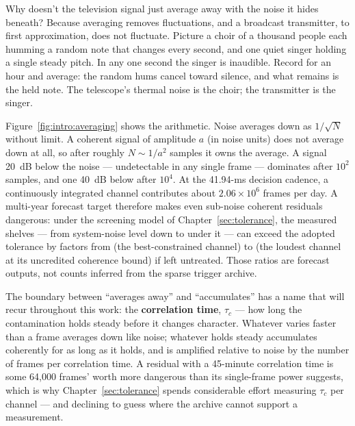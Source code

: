 Why doesn't the television signal just average away with the noise it hides beneath? Because averaging removes fluctuations, and a broadcast transmitter, to first approximation, does not fluctuate. Picture a choir of a thousand people each humming a random note that changes every second, and one quiet singer holding a single steady pitch. In any one second the singer is inaudible. Record for an hour and average: the random hums cancel toward silence, and what remains is the held note. The telescope's thermal noise is the choir; the transmitter is the singer.

Figure~\ref{fig:intro:averaging} shows the arithmetic. Noise averages down as $1/\sqrt{N}$ without limit. A coherent signal of amplitude $a$ (in noise units) does not average down at all, so after roughly $N \sim 1/a^2$ samples it owns the average. A signal 20~dB below the noise --- undetectable in any single frame --- dominates after $10^2$ samples, and one 40~dB below after $10^4$. At the 41.94-ms decision cadence, a continuously integrated channel contributes about $2.06\times10^6$ frames per day. A multi-year forecast target therefore makes even sub-noise coherent residuals dangerous: under the screening model of Chapter~\ref{sec:tolerance}, the measured shelves --- from system-noise level down to  under it --- can exceed the adopted tolerance by factors from  (the best-constrained channel) to  (the loudest channel at its uncredited coherence bound) if left untreated. Those ratios are forecast outputs, not counts inferred from the sparse trigger archive.

The boundary between ``averages away'' and ``accumulates'' has a name that will recur throughout this work: the \textbf{correlation time}, $\tau_c$ --- how long the contamination holds steady before it changes character. Whatever varies faster than a frame averages down like noise; whatever holds steady accumulates coherently for as long as it holds, and is amplified relative to noise by the number of frames per correlation time. A residual with a 45-minute correlation time is some 64,000 frames' worth more dangerous than its single-frame power suggests, which is why Chapter~\ref{sec:tolerance} spends considerable effort measuring $\tau_c$ per channel --- and declining to guess where the archive cannot support a measurement.

